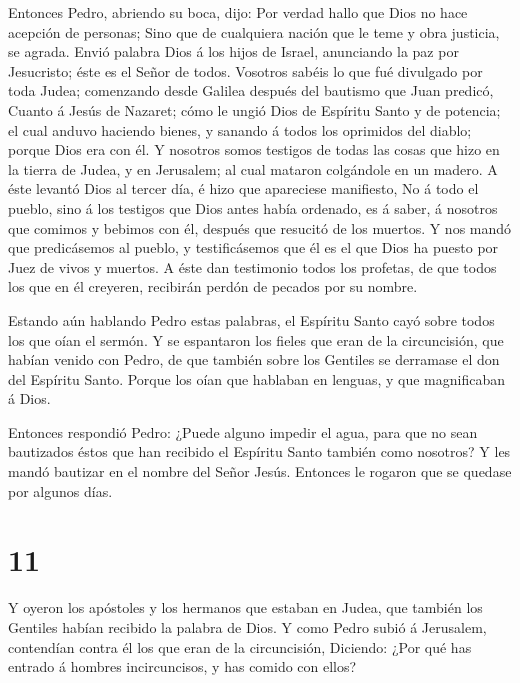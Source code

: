  Entonces Pedro, abriendo su boca, dijo: Por verdad hallo
que Dios no hace acepción de personas;  Sino que de
cualquiera nación que le teme y obra justicia, se agrada. 
Envió palabra Dios á los hijos de Israel, anunciando la paz por
Jesucristo; éste es el Señor de todos.  Vosotros sabéis lo
que fué divulgado por toda Judea; comenzando desde Galilea después del
bautismo que Juan predicó,  Cuanto á Jesús de Nazaret; cómo
le ungió Dios de Espíritu Santo y de potencia; el cual anduvo haciendo
bienes, y sanando á todos los oprimidos del diablo; porque Dios era con
él.  Y nosotros somos testigos de todas las cosas que hizo
en la tierra de Judea, y en Jerusalem; al cual mataron colgándole en un
madero.  A éste levantó Dios al tercer día, é hizo que
apareciese manifiesto,  No á todo el pueblo, sino á los
testigos que Dios antes había ordenado, es á saber, á nosotros que
comimos y bebimos con él, después que resucitó de los muertos.
 Y nos mandó que predicásemos al pueblo, y testificásemos
que él es el que Dios ha puesto por Juez de vivos y muertos.
 A éste dan testimonio todos los profetas, de que todos los
que en él creyeren, recibirán perdón de pecados por su nombre.

 Estando aún hablando Pedro estas palabras, el Espíritu
Santo cayó sobre todos los que oían el sermón.  Y se
espantaron los fieles que eran de la circuncisión, que habían venido con
Pedro, de que también sobre los Gentiles se derramase el don del
Espíritu Santo.  Porque los oían que hablaban en lenguas, y
que magnificaban á Dios.

 Entonces respondió Pedro: ¿Puede alguno impedir el agua,
para que no sean bautizados éstos que han recibido el Espíritu Santo
también como nosotros?  Y les mandó bautizar en el nombre
del Señor Jesús. Entonces le rogaron que se quedase por algunos días.

\hypertarget{section-10}{%
\section{11}\label{section-10}}

 Y oyeron los apóstoles y los hermanos que estaban en Judea,
que también los Gentiles habían recibido la palabra de Dios.
 Y como Pedro subió á Jerusalem, contendían contra él los
que eran de la circuncisión,  Diciendo: ¿Por qué has entrado
á hombres incircuncisos, y has comido con ellos?

